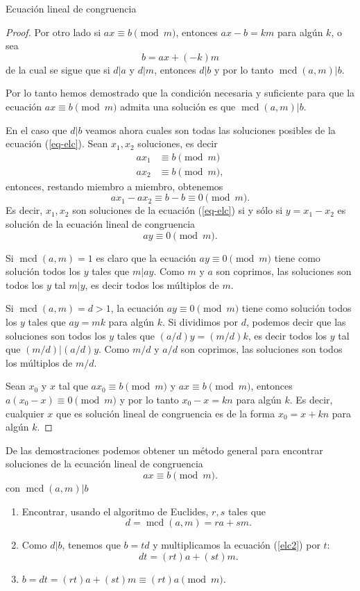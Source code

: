 \documentclass[11pt,spanish,makeidx]{amsbook}
\theoremstyle{definition}
\theoremstyle{remark}
\newcommand \mcd{\operatorname{mcd}}
\begin{document}
\begin{section}{Ecuación lineal de congruencia}
\begin{proof}
Por otro lado si $ax\equiv b\pmod{m}$, entonces $ax-b=km$ para algún $k$, o sea
$$
b=ax+(-k)m
$$
de la cual se sigue que si $d|a$ y $d|m$, entonces $d|b$ y por lo tanto $\mcd(a,m)|b$.

Por lo tanto hemos demostrado que la condición necesaria y suficiente para que la ecuación $ax\equiv b \pmod{m}$ admita una solución es que $\mcd(a,m)|b$.

En el caso que $d|b$ veamos ahora cuales son todas las soluciones posibles de la ecuación (\ref{eq-elc}). Sean $x_1,x_2$ soluciones, es decir
\begin{align*}
ax_1 &\equiv b \pmod{m} \\
ax_2 &\equiv b \pmod{m},
\end{align*}
entonces, restando miembro a miembro, obtenemos
$$
ax_1 -ax_2 \equiv b - b \equiv 0 \pmod{m}.
$$
Es decir, $x_1,x_2$ son soluciones de la ecuación (\ref{eq-elc}) si y sólo si  $y = x_1 -x_2$ es solución de la ecuación lineal de congruencia \begin{equation}\label{elc0}
ay \equiv 0 \pmod{m}.
\end{equation}

Si $\mcd(a,m) =1$ es claro que la ecuación $ay \equiv 0 \pmod{m}$ tiene como solución todos los $y$ tales que $m|ay$. Como $m$ y $a$ son  coprimos, las soluciones son todos los $y$ tal $m|y$, es decir todos los múltiplos de $m$.

Si $\mcd(a,m) =d > 1$,  la ecuación $ay \equiv 0 \pmod{m}$ tiene como solución todos los $y$ tales que $ay=mk$ para algún $k$. Si dividimos por $d$, podemos decir que las soluciones son todos los $y$ tales que $(a/d)y = (m/d)k$, es decir todos los $y$ tal que $(m/d)|(a/d)y$. Como $m/d$ y $a/d$ son coprimos, las soluciones son todos los múltiplos de $m/d$.

Sean $x_0$ y $x$ tal que $ax_0 \equiv b \pmod{m}$ y $ax \equiv b \pmod{m}$, entonces $a(x_0-x) \equiv 0 \pmod{m}$ y por lo tanto $x_0-x = kn$ para algún $k$. Es decir, cualquier $x$ que es solución lineal de congruencia es de la forma $x_0 = x+kn$ para algún $k$.
\end{proof}

De las demostraciones podemos obtener un método general para encontrar soluciones de la ecuación lineal de congruencia
$$
ax \equiv b \pmod{m}.
$$
con $\mcd(a,m)|b$
\begin{enumerate}
\item Encontrar, usando el algoritmo de Euclides, $r,s$ tales que 
\begin{equation}\label{elc2}
d =\mcd(a,m) = ra+sm.
\end{equation}
\item Como $d|b$, tenemos que $b = td$ y multiplicamos la ecuación (\ref{elc2}) por $t$: $$dt =  (rt)a+(st)m.$$
\item $b = dt = (rt)a+(st)m \equiv (rt)a \pmod{m}$. 


\end{enumerate}
\end{section}
\end{document}
